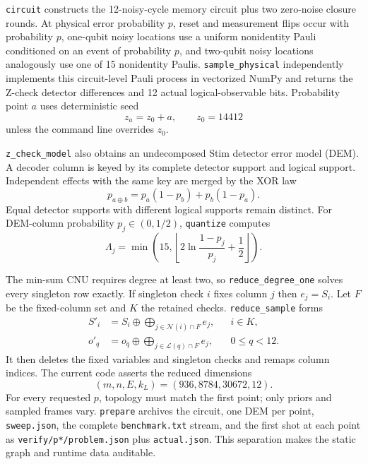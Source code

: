 \documentclass[10pt,conference]{IEEEtran}
\begin{document}
\texttt{circuit} constructs the 12-noisy-cycle memory circuit plus two
zero-noise closure rounds.  At physical error probability $p$, reset and
measurement flips occur with probability $p$, one-qubit noisy locations use a
uniform nonidentity Pauli conditioned on an event of probability $p$, and
two-qubit noisy locations analogously use one of 15 nonidentity Paulis.
\texttt{sample\_physical} independently implements this circuit-level Pauli
process in vectorized NumPy and returns the Z-check detector differences and 12
actual logical-observable bits.  Probability point $a$ uses deterministic seed
\begin{equation}
 z_a=z_0+a,\qquad z_0=14412
 \label{eq:sample-seed}
\end{equation}
unless the command line overrides $z_0$.

\texttt{z\_check\_model} also obtains an undecomposed Stim detector error model
(DEM).  A decoder column is keyed by its complete detector support and logical
support.  Independent effects with the same key are merged by the XOR law
\begin{equation}
 p_{a\oplus b}=p_a(1-p_b)+p_b(1-p_a).
 \label{eq:xor-probability}
\end{equation}
Equal detector supports with different logical supports remain distinct.
For DEM-column probability $p_j\in(0,1/2)$, \texttt{quantize} computes
\begin{equation}
 \Lambda_j=\min\!\left(15,
 \left\lfloor2\ln\frac{1-p_j}{p_j}+\frac12\right\rfloor\right).
 \label{eq:prior-quantization}
\end{equation}

The min-sum CNU requires degree at least two, so
\texttt{reduce\_degree\_one} solves every singleton row exactly.  If singleton
check $i$ fixes column $j$ then $e_j=S_i$.  Let $F$ be the fixed-column set and
$K$ the retained checks.  \texttt{reduce\_sample} forms
\begin{align}
 S'_i&=S_i\oplus\bigoplus_{j\in\mathcal N(i)\cap F}e_j,
 &&i\in K,\label{eq:reduced-syndrome}\\
 o'_q&=o_q\oplus\bigoplus_{j\in\mathcal L(q)\cap F}e_j,
 &&0\leq q<12.\label{eq:reduced-logical}
\end{align}
It then deletes the fixed variables and singleton checks and remaps column
indices.  The current code asserts the reduced dimensions
\begin{equation}
 (m,n,E,k_L)=(936,8784,30672,12).
 \label{eq:bb144-reduced-dimensions}
\end{equation}
For every requested $p$, topology must match the first point; only priors and
sampled frames vary.  \texttt{prepare} archives the circuit, one DEM per point,
\texttt{sweep.json}, the complete \texttt{benchmark.txt} stream, and the first
shot at each point as \texttt{verify/p*/problem.json} plus
\texttt{actual.json}.  This separation makes the static graph and runtime data
auditable.
\end{document}
